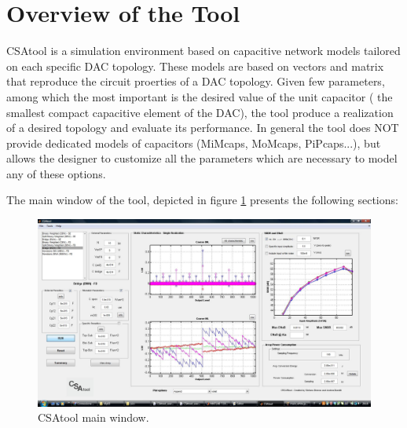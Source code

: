 \label{overview}

\section{Overview of the Tool}

CSAtool is a simulation environment based on capacitive network models tailored on each specific DAC topology. These models are based on vectors and matrix that reproduce the circuit proerties of a DAC topology. Given few parameters, among which the most important is the desired value of the unit capacitor ( the smallest compact capacitive element of the DAC), the tool produce a realization of a desired topology and evaluate its performance. In general the tool does NOT provide dedicated models of capacitors (MiMcaps, MoMcaps, PiPcaps...), but allows the designer to customize all the parameters which are necessary to model any of these options.

The main window of the tool, depicted in figure \ref{fig:main} presents the following sections:

\begin{figure}[h!]
	\centering
	\includegraphics[scale=0.35]{pics/main_white.jpg}
	\caption{CSAtool main window.}
	\label{fig:main}
\end{figure}


